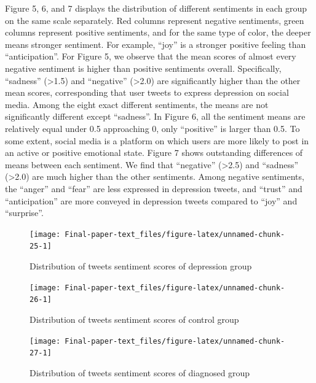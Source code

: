 \documentclass[]{article}
\begin{document}
Figure 5, 6, and 7 displays the distribution of different sentiments in
each group on the same scale separately. Red columns represent negative
sentiments, green columns represent positive sentiments, and for the
same type of color, the deeper means stronger sentiment. For example,
``joy'' is a stronger positive feeling than ``anticipation''. For Figure
5, we observe that the mean scores of almost every negative sentiment is
higher than positive sentiments overall. Specifically, ``sadness''
(\textgreater{}1.5) and ``negative'' (\textgreater{}2.0) are
significantly higher than the other mean scores, corresponding that user
tweets to express depression on social media. Among the eight exact
different sentiments, the means are not significantly different except
``sadness''. In Figure 6, all the sentiment means are relatively equal
under 0.5 approaching 0, only ``positive'' is larger than 0.5. To some
extent, social media is a platform on which users are more likely to
post in an active or positive emotional state. Figure 7 shows
outstanding differences of means between each sentiment. We find that
``negative'' (\textgreater{}2.5) and ``sadness'' (\textgreater{}2.0) are
much higher than the other sentiments. Among negative sentiments, the
``anger'' and ``fear'' are less expressed in depression tweets, and
``trust'' and ``anticipation'' are more conveyed in depression tweets
compared to ``joy'' and ``surprise''.

\begin{figure}

{\centering \texttt{[image: Final-paper-text\_files/figure-latex/unnamed-chunk-25-1]} 

}

\caption{Distribution of tweets sentiment scores of depression group}\label{fig:unnamed-chunk-25}
\end{figure}

\begin{figure}

{\centering \texttt{[image: Final-paper-text\_files/figure-latex/unnamed-chunk-26-1]} 

}

\caption{Distribution of tweets sentiment scores of control group}\label{fig:unnamed-chunk-26}
\end{figure}

\begin{figure}

{\centering \texttt{[image: Final-paper-text\_files/figure-latex/unnamed-chunk-27-1]} 

}

\caption{Distribution of tweets sentiment scores of diagnosed group}\label{fig:unnamed-chunk-27}
\end{figure}
\end{document}

